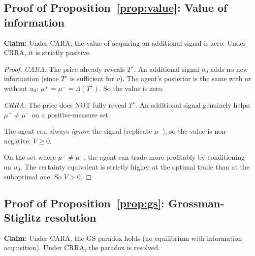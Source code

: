 \documentclass[12pt,letterpaper]{article}
\theoremstyle{definition}
\theoremstyle{remark}
\newcommand{\Lam}{\Lambda}            %
\newcommand{\Tstar}{T^{\!\star}}
\newcommand{\1}{\mathbf{1}}
\begin{document}
\subsection*{Proof of Proposition~\ref{prop:value}: Value of information}

\textbf{Claim:} Under CARA, the value of acquiring an additional signal
is zero. Under CRRA, it is strictly positive.

\begin{proof}
\emph{CARA:} The price already reveals $\Tstar$. An additional signal
$u_0$ adds no new information (since $\Tstar$ is sufficient for $v$).
The agent's posterior is the same with or without $u_0$:
$\mu^+ = \mu^- = \Lam(\Tstar)$. So the value is zero.

\emph{CRRA:} The price does NOT fully reveal $\Tstar$. An additional
signal genuinely helps: $\mu^+ \neq \mu^-$ on a positive-measure set.

The agent can always \emph{ignore} the signal (replicate $\mu^-$), so
the value is non-negative: $V \geq 0$.

On the set where $\mu^+ \neq \mu^-$, the agent can trade more
profitably by conditioning on $u_0$. The certainty equivalent is
strictly higher at the optimal trade than at the suboptimal one.
So $V > 0$.
\end{proof}

\subsection*{Proof of Proposition~\ref{prop:gs}: Grossman-Stiglitz
resolution}

\textbf{Claim:} Under CARA, the GS paradox holds (no equilibrium with
information acquisition). Under CRRA, the paradox is resolved.
\end{document}
